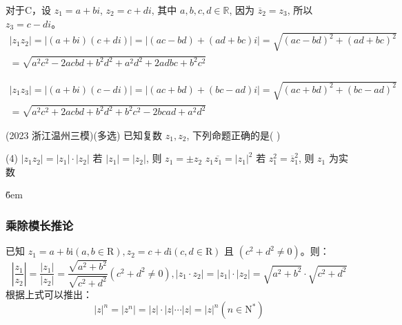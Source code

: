 \begin{example}
\begin{solution}
\begin{itemize}
        \end{itemize}
        \begin{tips}
            对于C，设 $z_{1}=a+bi$, $z_{2}=c+di$, 其中 $a,b,c,d\in \mathbb{R}$, 因为 $\overline{z}_{2}=z_{3}$, 所以 $z_{3}=c-di$。
            $$
                \begin{aligned}
                    |z_{1}z_{2}|=|(a+bi)(c+di)|=|(ac-bd)+(ad+bc)i|=\sqrt{(ac-bd)^{2}+(ad+bc)^{2}} \\
                    =\sqrt{a^{2}c^{2}-2acbd+b^{2}d^{2}+a^{2}d^{2}+2adbc+b^{2}c^{2}}
                \end{aligned}
            $$

            $$
                \begin{aligned}
                    |z_{1}z_{3}|=|(a+bi)(c-di)|=|(ac+bd)+(bc-ad)i|=\sqrt{(ac+bd)^{2}+(bc-ad)^{2}} \\
                    =\sqrt{a^{2}c^{2}+2acbd+b^{2}d^{2}+b^{2}c^{2}-2bcad+a^{2}d^{2}}
                \end{aligned}
            $$
        \end{tips}
    \end{solution}
\end{example}

\begin{example}(2023 浙江温州三模)(多选)
    已知复数 $z_1, z_2$, 下列命题正确的是( \quad )
    \begin{tasks}(4)
        \task $|z_{1}z_{2}|=|z_{1}|\cdot|z_{2}|$
        \task 若 $|z_{1}|=|z_{2}|$, 则 $z_{1}=\pm z_{2}$
        \task $z_{1}\overline{z_{1}}=|z_{1}|^{2}$
        \task 若 $z_{1}^{2}=\overline{z}_{1}^{2}$, 则 $z_1$ 为实数
    \end{tasks}
\end{example}

\v{6em}

\subsubsection{乘除模长推论}

\begin{theorem}[乘除模长推论]
    已知 $z_1=a+b \mathrm{i}(a, b \in \mathrm{R}), z_2=c+d \mathrm{i}(c, d \in \mathrm{R})$ 且 $\left(c^2+d^2 \neq 0\right)$。则：
    $$\left|\frac{z_1}{z_2}\right|=\frac{\left|z_1\right|}{\left|z_2\right|}=\frac{\sqrt{a^2+b^2}}{\sqrt{c^2+d^2}}\left(c^2+d^2 \neq 0\right),\left|z_1 \cdot z_2\right|=\left|z_1\right| \cdot\left|z_2\right|=\sqrt{a^2+b^2} \cdot \sqrt{c^2+d^2}$$
    根据上式可以推出：
    $$|z|^n=|z^n|=|z| \cdot|z| \cdots|z|=|z|^n(n \in \mathrm{N}^*)$$
\end{theorem}

